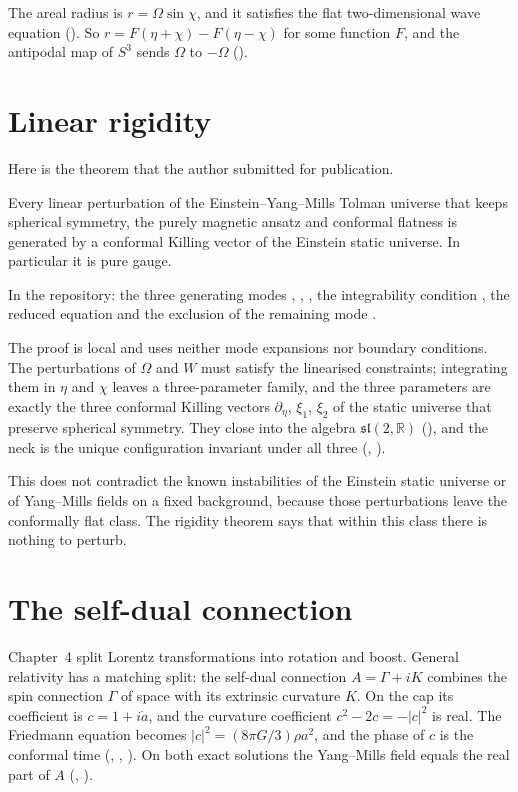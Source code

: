 The areal radius is $r=\Omega\sin\chi$, and it satisfies the flat two-dimensional wave equation (). So $r=F(\eta+\chi)-F(\eta-\chi)$ for some function $F$, and the antipodal map of $S^3$ sends $\Omega$ to $-\Omega$ ().

\section{Linear rigidity}

Here is the theorem that the author submitted for publication.

\begin{theorem}\proved\label{thm:rigidity}
Every linear perturbation of the Einstein--Yang--Mills Tolman universe that keeps spherical symmetry, the purely magnetic ansatz and conformal flatness is generated by a conformal Killing vector of the Einstein static universe. In particular it is pure gauge.
\end{theorem}
\noindent In the repository: the three generating modes , , , the integrability condition , the reduced equation  and the exclusion of the remaining mode .

The proof is local and uses neither mode expansions nor boundary conditions. The perturbations of $\Omega$ and $W$ must satisfy the linearised constraints; integrating them in $\eta$ and $\chi$ leaves a three-parameter family, and the three parameters are exactly the three conformal Killing vectors $\partial_\eta$, $\xi_1$, $\xi_2$ of the static universe that preserve spherical symmetry. They close into the algebra $\mathfrak{sl}(2,\mathbb R)$ (), and the neck is the unique configuration invariant under all three (, ).

This does not contradict the known instabilities of the Einstein static universe or of Yang--Mills fields on a fixed background, because those perturbations leave the conformally flat class. The rigidity theorem says that within this class there is nothing to perturb.

\section{The self-dual connection}

Chapter~4 split Lorentz transformations into rotation and boost. General relativity has a matching split: the self-dual connection $A=\Gamma+iK$ combines the spin connection $\Gamma$ of space with its extrinsic curvature $K$. On the cap its coefficient is $c=1+i\dot a$, and the curvature coefficient $c^2-2c=-|c|^2$ is real. The Friedmann equation becomes $|c|^2=(8\pi G/3)\rho a^2$, and the phase of $c$ is the conformal time (, , ). On both exact solutions the Yang--Mills field equals the real part of $A$ (, ).

